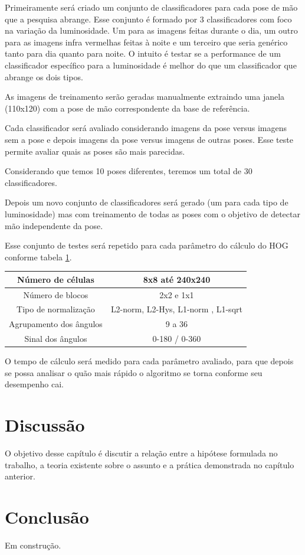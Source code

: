 Primeiramente será criado um conjunto de classificadores para cada pose de mão que a pesquisa abrange. Esse conjunto é formado por 3 classificadores com foco na variação da luminosidade. Um para as imagens feitas durante o dia, um outro para as imagens infra vermelhas feitas à noite e um terceiro que seria genérico tanto para dia quanto para noite. O intuito é testar se a performance de um classificador específico para a luminosidade é melhor do que um classificador que abrange os dois tipos.

As imagens de treinamento serão geradas manualmente extraindo uma janela (110x120) com a pose de mão correspondente da base de referência. 

Cada classificador será avaliado considerando imagens da pose versus imagens sem a pose e depois imagens da pose versus imagens de outras poses. Esse teste permite avaliar quais as poses são mais parecidas.

Considerando que temos 10 poses diferentes, teremos um total de 30 classificadores.
 
Depois um novo conjunto de classificadores será gerado (um para cada tipo de luminosidade) mas com treinamento de todas as poses com o objetivo de detectar mão independente da pose.

Esse conjunto de testes será repetido para cada parâmetro do cálculo do HOG conforme tabela \ref{table:hog_var}.

\begin{table}[H]
	\centering
		\begin{tabular}{|c|c|}
		\hline  
			Número de células 		&  8x8 até 240x240 		\\ 
		\hline  
			Número de blocos  		&  2x2 e 1x1 			\\ 
		\hline 
			Tipo de normalização  	&  L2-norm, L2-Hys,  L1-norm , L1-sqrt 										\\ 
		\hline 
			Agrupamento dos ângulos	&  9 a 36				\\ 
		\hline
			Sinal dos ângulos		& 0-180 / 0-360			\\
		\hline		
		\end{tabular} 
		\label{table:hog_var}
\end{table}

O tempo de cálculo será medido para cada parâmetro avaliado, para que depois se possa analisar o quão mais rápido o algoritmo se torna conforme seu desempenho cai.

\chapter{Discussão}

O objetivo desse capítulo é discutir a relação entre a hipótese formulada no trabalho, a teoria existente sobre o assunto e a prática demonstrada no capítulo anterior.

\chapter{Conclusão}

Em construção.